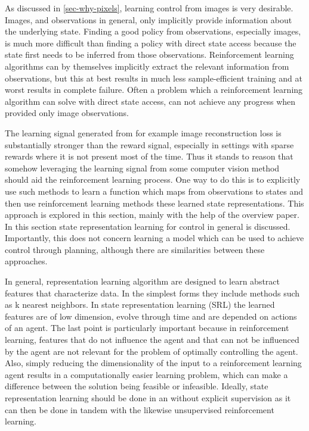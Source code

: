 As discussed in \ref{sec-why-pixels}, learning control from images is 
very desirable. Images, and observations in general, only implicitly 
provide information about the underlying state. 
Finding a good policy from observations, especially images,
is much more difficult than finding a policy with direct state access
because the state first needs to be inferred from those observations.
Reinforcement learning algorithms can by themselves implicitly extract
the relevant information from observations, but this at best results
in much less sample-efficient training and at worst results
in complete failure.
Often a problem which a reinforcement learning algorithm can solve
with direct state access, can not achieve any progress when
provided only image observations.



The learning signal generated from for example
image reconstruction loss is substantially stronger than the reward signal,
especially in settings with sparse rewards where it is 
not present most of the time.
Thus it stands to reason that somehow leveraging the learning
signal from some computer vision method should aid the reinforcement learning 
process. 
One way to do this is to explicitly use such methods to learn 
a function which maps from observations to states
and then use reinforcement learning methods these learned state
representations.
This approach is explored in this section, mainly with the help
of the 
\cite{srloverview}
overview paper.
In this section  state representation learning for control in general is discussed.
Importantly, this does not concern learning a model 
which can be used to achieve control through planning,
although there are similarities between these approaches.

In general, representation learning algorithm are designed to learn
abstract features that characterize data.
In the simplest forms they include methods such as k nearest neighbors.
In state representation learning (SRL) the learned features
are of low dimension, evolve through time and are depended
on actions of an agent.
The last point is particularly important because in reinforcement learning,
features that do not influence the agent and that can not be influenced
by the agent are not relevant for the problem of optimally controlling the agent.
Also, simply reducing the dimensionality of the input to a reinforcement learning
agent results in a computationally easier learning problem,
which can make a difference between the solution being feasible or infeasible.
Ideally, state  representation learning should be done in an without explicit supervision
as it can then be done in tandem with the likewise unsupervised reinforcement learning.

